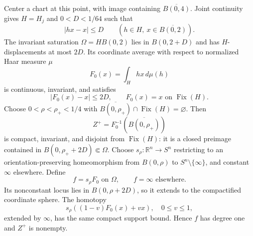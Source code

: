 \documentclass[11pt]{amsart}
\numberwithin{equation}{section}
\theoremstyle{definition}
\theoremstyle{remark}
\DeclareMathOperator{\Fix}{Fix}
\newcommand{\R}{\mathbb R}
\begin{document}
Center a chart at this point, with image containing $\overline{B(0,4)}$.
Joint continuity gives $H=H_j$ and $0<D<1/64$ such that
\begin{equation}\label{geo:small-H}
 |hx-x|\le D\qquad(h\in H,\ x\in\overline{B(0,2)}).
\end{equation}
The invariant saturation $\Omega=HB(0,2)$ lies in $B(0,2+D)$ and has
$H$-displacements at most $2D$. Its coordinate average with respect to
normalized Haar measure $\mu$
\begin{equation}\label{geo:average}
 F_0(x)=\int_H hx\,d\mu(h)
\end{equation}
is continuous, invariant, and satisfies
\begin{equation}\label{geo:average-bounds}
 |F_0(x)-x|\le2D,\qquad F_0(x)=x\text{ on }\Fix(H).
\end{equation}
Choose $0<\rho<\rho_+<1/4$ with
$\overline{B(0,\rho_+)}\cap\Fix(H)=\varnothing$. Then
\begin{equation}\label{geo:Zplus}
 Z^+=F_0^{-1}(\overline{B(0,\rho_+)})
\end{equation}
is compact, invariant, and disjoint from $\Fix(H)$: it is a closed
preimage contained in $B(0,\rho_++2D)\Subset\Omega$.
Choose $s_\rho:\R^n\to S^n$ restricting to an orientation-preserving
homeomorphism from $B(0,\rho)$ to $S^n\setminus\{\infty\}$, and constant
$\infty$ elsewhere. Define
\begin{equation}\label{geo:f}
 f=s_\rho F_0\text{ on }\Omega,\qquad f=\infty\text{ elsewhere}.
\end{equation}
Its nonconstant locus lies in $B(0,\rho+2D)$, so it extends to the
compactified coordinate sphere. The homotopy
\begin{equation}\label{geo:pinch-homotopy}
 s_\rho((1-v)F_0(x)+vx),\quad 0\le v\le1,
\end{equation}
extended by $\infty$, has the same compact support bound. Hence $f$ has
degree one and $Z^+$ is nonempty.
\end{document}
